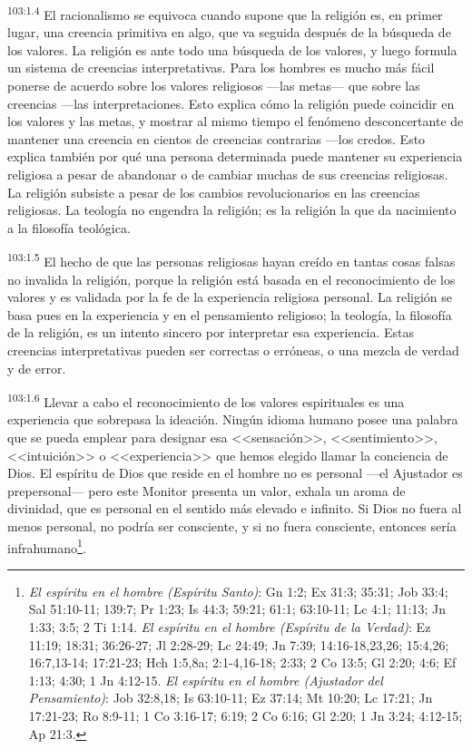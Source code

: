 \par
\textsuperscript{103:1.4} El racionalismo se equivoca cuando supone que la religión es, en primer lugar, una creencia primitiva en algo, que va seguida después de la búsqueda de los valores. La religión es ante todo una búsqueda de los valores, y luego formula un sistema de creencias interpretativas. Para los hombres es mucho más fácil ponerse de acuerdo sobre los valores religiosos ---las metas--- que sobre las creencias ---las interpretaciones. Esto explica cómo la religión puede coincidir en los valores y las metas, y mostrar al mismo tiempo el fenómeno desconcertante de mantener una creencia en cientos de creencias contrarias ---los credos. Esto explica también por qué una persona determinada puede mantener su experiencia religiosa a pesar de abandonar o de cambiar muchas de sus creencias religiosas. La religión subsiste a pesar de los cambios revolucionarios en las creencias religiosas. La teología no engendra la religión; es la religión la que da nacimiento a la filosofía teológica.

\par
\textsuperscript{103:1.5} El hecho de que las personas religiosas hayan creído en tantas cosas falsas no invalida la religión, porque la religión está basada en el reconocimiento de los valores y es validada por la fe de la experiencia religiosa personal. La religión se basa pues en la experiencia y en el pensamiento religioso; la teología, la filosofía de la religión, es un intento sincero por interpretar esa experiencia. Estas creencias interpretativas pueden ser correctas o erróneas, o una mezcla de verdad y de error.

\par
\textsuperscript{103:1.6} Llevar a cabo el reconocimiento de los valores espirituales es una experiencia que sobrepasa la ideación. Ningún idioma humano posee una palabra que se pueda emplear para designar esa <<sensación>>, <<sentimiento>>, <<intuición>> o <<experiencia>> que hemos elegido llamar la conciencia de Dios. El espíritu de Dios que reside en el hombre no es personal ---el Ajustador es prepersonal--- pero este Monitor presenta un valor, exhala un aroma de divinidad, que es personal en el sentido más elevado e infinito. Si Dios no fuera al menos personal, no podría ser consciente, y si no fuera consciente, entonces sería infrahumano\footnote{\textit{El espíritu en el hombre (Espíritu Santo)}: Gn 1:2; Ex 31:3; 35:31; Job 33:4; Sal 51:10-11; 139:7; Pr 1:23; Is 44:3; 59:21; 61:1; 63:10-11; Lc 4:1; 11:13; Jn 1:33; 3:5; 2 Ti 1:14. \textit{El espíritu en el hombre (Espíritu de la Verdad)}: Ez 11:19; 18:31; 36:26-27; Jl 2:28-29; Lc 24:49; Jn 7:39; 14:16-18,23,26; 15:4,26; 16:7,13-14; 17:21-23; Hch 1:5,8a; 2:1-4,16-18; 2:33; 2 Co 13:5; Gl 2:20; 4:6; Ef 1:13; 4:30; 1 Jn 4:12-15. \textit{El espíritu en el hombre (Ajustador del Pensamiento)}: Job 32:8,18; Is 63:10-11; Ez 37:14; Mt 10:20; Lc 17:21; Jn 17:21-23; Ro 8:9-11; 1 Co 3:16-17; 6:19; 2 Co 6:16; Gl 2:20; 1 Jn 3:24; 4:12-15; Ap 21:3.}.

